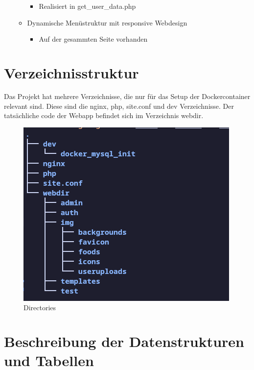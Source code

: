 \documentclass{report}
\begin{document}
\begin{itemize}
\begin{itemize}
            \begin{itemize}
                \item Realisiert in get\_user\_data.php
            \end{itemize}
        \item Dynamische Menüstruktur mit responsive Webdesign\\
            \begin{itemize}
                \item Auf der gesammten Seite vorhanden
            \end{itemize}
    \end{itemize}
\end{itemize}
\label{tab:my_label}

\section{Verzeichnisstruktur}
Das Projekt hat mehrere Verzeichnisse, die nur für das Setup der Dockercontainer relevant sind. Diese sind die nginx, php, site.conf und dev Verzeichnisse. Der tatsächliche code der Webapp befindet sich im Verzeichnis webdir.

\begin{figure}[!hbt]
    \centering
    \includegraphics[scale=0.75]{Pictures/Dirs1.png}
    \caption{Directories}
    \label{fig:sfig1}
\end{figure}



\section{Beschreibung der Datenstrukturen und Tabellen}
\end{document}
